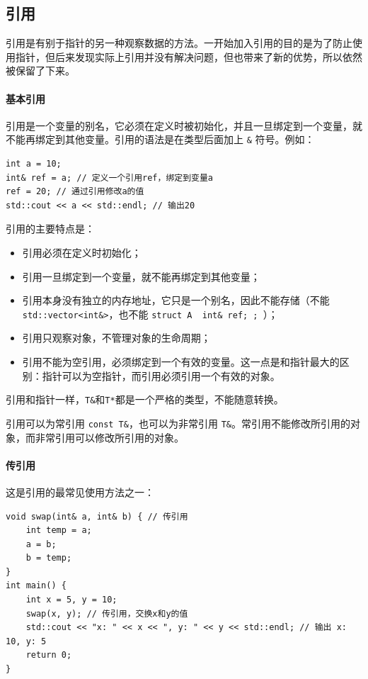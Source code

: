 \subsection{引用}

引用是有别于指针的另一种观察数据的方法。一开始加入引用的目的是为了防止使用指针，但后来发现实际上引用并没有解决问题，但也带来了新的优势，所以依然被保留了下来。

\paragraph{基本引用} 引用是一个变量的别名，它必须在定义时被初始化，并且一旦绑定到一个变量，就不能再绑定到其他变量。引用的语法是在类型后面加上 \verb|&| 符号。例如：
\begin{verbatim}
int a = 10;
int& ref = a; // 定义一个引用ref，绑定到变量a
ref = 20; // 通过引用修改a的值
std::cout << a << std::endl; // 输出20
\end{verbatim}

引用的主要特点是：
\begin{itemize}
    \item 引用必须在定义时初始化；
    \item 引用一旦绑定到一个变量，就不能再绑定到其他变量；
    \item 引用本身没有独立的内存地址，它只是一个别名，因此不能存储（不能 \texttt{std::vector<int&>}，也不能 \texttt{struct A { int& ref; }; }）；
    \item 引用只观察对象，不管理对象的生命周期；
    \item 引用不能为空引用，必须绑定到一个有效的变量。这一点是和指针最大的区别：指针可以为空指针，而引用必须引用一个有效的对象。
\end{itemize}

引用和指针一样，\verb|T&|和\verb|T*|都是一个严格的类型，不能随意转换。

引用可以为常引用 \verb|const T&|，也可以为非常引用 \verb|T&|。常引用不能修改所引用的对象，而非常引用可以修改所引用的对象。

\paragraph{传引用} 这是引用的最常见使用方法之一：
\begin{verbatim}
void swap(int& a, int& b) { // 传引用
    int temp = a;
    a = b;
    b = temp;
}
int main() {
    int x = 5, y = 10;
    swap(x, y); // 传引用，交换x和y的值
    std::cout << "x: " << x << ", y: " << y << std::endl; // 输出 x: 10, y: 5
    return 0;
}
\end{verbatim}

